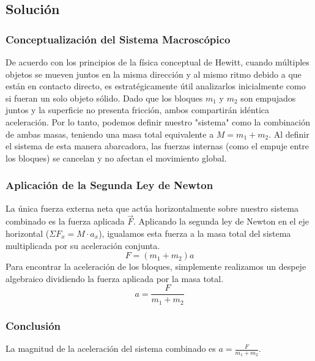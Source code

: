 \documentclass[12pt]{article}
\begin{document}
\begin{center}
\end{center}

\subsection*{Solución}

\subsubsection*{Conceptualización del Sistema Macroscópico}
De acuerdo con los principios de la física conceptual de Hewitt, cuando múltiples objetos se mueven juntos en la misma dirección y al mismo ritmo debido a que están en contacto directo, es estratégicamente útil analizarlos inicialmente como si fueran un solo objeto sólido. Dado que los bloques $m_1$ y $m_2$ son empujados juntos y la superficie no presenta fricción, ambos compartirán idéntica aceleración. Por lo tanto, podemos definir nuestro "sistema" como la combinación de ambas masas, teniendo una masa total equivalente a $M = m_1 + m_2$. Al definir el sistema de esta manera abarcadora, las fuerzas internas (como el empuje entre los bloques) se cancelan y no afectan el movimiento global.

\subsubsection*{Aplicación de la Segunda Ley de Newton}
La única fuerza externa neta que actúa horizontalmente sobre nuestro sistema combinado es la fuerza aplicada $\vec{F}$. Aplicando la segunda ley de Newton en el eje horizontal ($\Sigma F_x = M \cdot a_x$), igualamos esta fuerza a la masa total del sistema multiplicada por su aceleración conjunta.
$$F = (m_1 + m_2)a$$
Para encontrar la aceleración de los bloques, simplemente realizamos un despeje algebraico dividiendo la fuerza aplicada por la masa total.
$$a = \frac{F}{m_1 + m_2}$$

\subsubsection*{Conclusión}
La magnitud de la aceleración del sistema combinado es $a = \frac{F}{m_1 + m_2}$.
\end{document}
